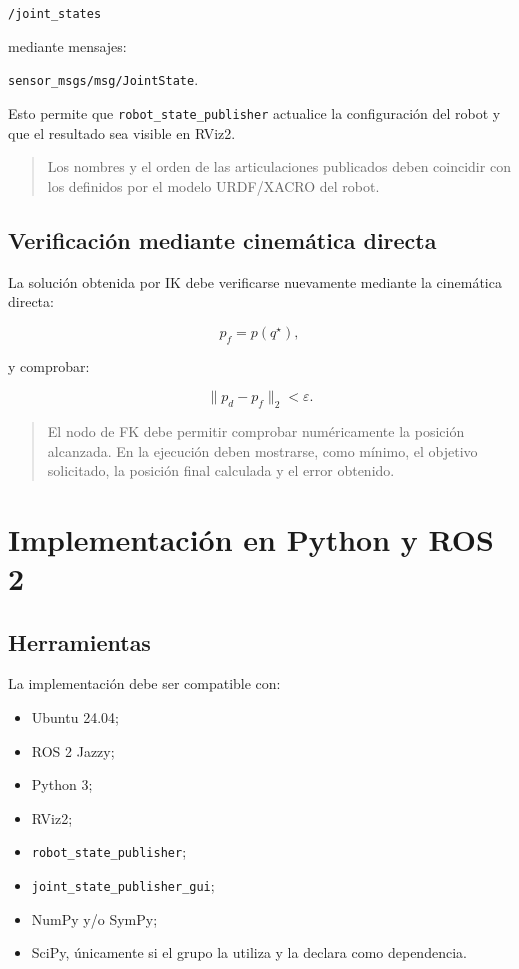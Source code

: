 \documentclass[journal]{IEEEtran}
\newcommand{\instr}[1]{%
\begin{quote}
\small
\noindent\textbf{\color{blue}{INSTRUCCIÓN:}} #1
\end{quote}
}
\begin{document}
\begin{center}
\texttt{/joint\_states}
\end{center}

mediante mensajes:

\begin{center}
\texttt{sensor\_msgs/msg/JointState}.
\end{center}

Esto permite que \texttt{robot\_state\_publisher} actualice la configuración del robot y que el resultado sea visible en RViz2.

\instr{Los nombres y el orden de las articulaciones publicados deben coincidir con los definidos por el modelo URDF/XACRO del robot.}

\subsection{Verificación mediante cinemática directa}

La solución obtenida por IK debe verificarse nuevamente mediante la cinemática directa:

\begin{equation}
p_f = p(q^\star),
\end{equation}

y comprobar:

\begin{equation}
\|p_d-p_f\|_2 < \varepsilon.
\end{equation}

\instr{El nodo de FK debe permitir comprobar numéricamente la posición alcanzada. En la ejecución deben mostrarse, como mínimo, el objetivo solicitado, la posición final calculada y el error obtenido.}

\section{Implementación en Python y ROS 2}

\subsection{Herramientas}

La implementación debe ser compatible con:

\begin{itemize}
    \item Ubuntu 24.04;
    \item ROS 2 Jazzy;
    \item Python 3;
    \item RViz2;
    \item \texttt{robot\_state\_publisher};
    \item \texttt{joint\_state\_publisher\_gui};
    \item NumPy y/o SymPy;
    \item SciPy, únicamente si el grupo la utiliza y la declara como dependencia.
\end{itemize}
\end{document}
